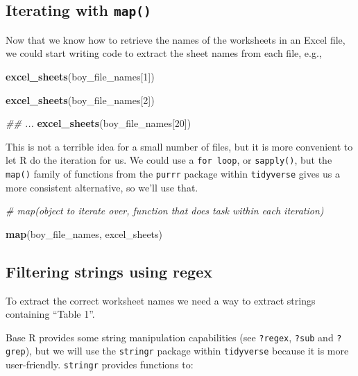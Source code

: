 \documentclass[
]{book}
\newenvironment{Shaded}{\begin{snugshade}}{\end{snugshade}}
\newcommand{\CommentTok}[1]{\textcolor[rgb]{0.56,0.35,0.01}{\textit{#1}}}
\newcommand{\DecValTok}[1]{\textcolor[rgb]{0.00,0.00,0.81}{#1}}
\newcommand{\KeywordTok}[1]{\textcolor[rgb]{0.13,0.29,0.53}{\textbf{#1}}}
\newcommand{\NormalTok}[1]{#1}
\begin{document}
\hypertarget{iterating-with-map}{%
\subsection{\texorpdfstring{Iterating with \texttt{map()}}{Iterating with map()}}\label{iterating-with-map}}

Now that we know how to retrieve the names of the worksheets in an
Excel file, we could start writing code to extract the sheet names from
each file, e.g.,

\begin{Shaded}
\begin{Highlighting}[]
\KeywordTok{excel_sheets}\NormalTok{(boy_file_names[}\DecValTok{1}\NormalTok{])}

\KeywordTok{excel_sheets}\NormalTok{(boy_file_names[}\DecValTok{2}\NormalTok{])}

\CommentTok{## ...}
\KeywordTok{excel_sheets}\NormalTok{(boy_file_names[}\DecValTok{20}\NormalTok{])}
\end{Highlighting}
\end{Shaded}

This is not a terrible idea for a small number of files, but it is
more convenient to let R do the iteration for us. We could use a \texttt{for\ loop},
or \texttt{sapply()}, but the \texttt{map()} family of functions from the \texttt{purrr}
package within \texttt{tidyverse} gives us a more consistent alternative,
so we'll use that.

\begin{Shaded}
\begin{Highlighting}[]
\CommentTok{# map(object to iterate over, function that does task within each iteration)}

\KeywordTok{map}\NormalTok{(boy_file_names, excel_sheets)}
\end{Highlighting}
\end{Shaded}

\hypertarget{filtering-strings-using-regex}{%
\subsection{Filtering strings using regex}\label{filtering-strings-using-regex}}

To extract the correct worksheet names we need a way to extract
strings containing ``Table 1''.

Base R provides some string manipulation capabilities
(see \texttt{?regex}, \texttt{?sub} and \texttt{?grep}), but we will use the
\texttt{stringr} package within \texttt{tidyverse} because it is more
user-friendly. \texttt{stringr} provides functions to:
\end{document}
